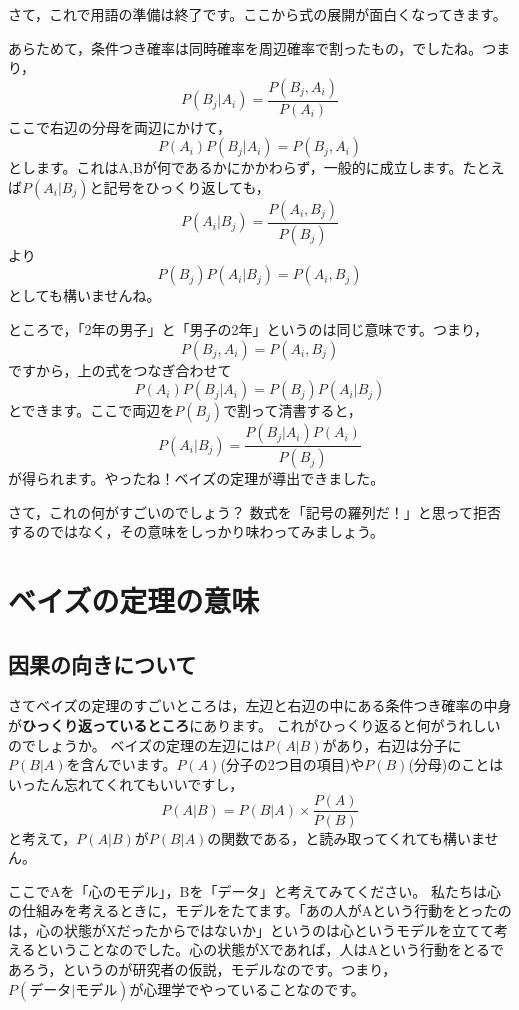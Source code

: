 \documentclass{ltjbook}
\begin{document}
さて，これで用語の準備は終了です。ここから式の展開が面白くなってきます。

あらためて，条件つき確率は同時確率を周辺確率で割ったもの，でしたね。つまり，
\[ P(B_j | A_i) = \frac{P(B_j,A_i)}{P(A_i)} \]
ここで右辺の分母を両辺にかけて，
\[ P(A_i)P(B_j|A_i) = P(B_j,A_i) \]
とします。これはA,Bが何であるかにかかわらず，一般的に成立します。たとえば$P(A_i|B_j)$と記号をひっくり返しても，
\[ P(A_i|B_j) = \frac{P(A_i,B_j)}{P(B_j)} \]
より
\[P(B_j)P(A_i|B_j) = P(A_i,B_j) \]
としても構いませんね。


ところで，「2年の男子」と「男子の2年」というのは同じ意味です。つまり，
\[P(B_j,A_i) = P(A_i, B_j) \]
ですから，上の式をつなぎ合わせて
\[P(A_i)P(B_j|A_i) = P(B_j)P(A_i|B_j) \]
とできます。ここで両辺を$P(B_j)$で割って清書すると，
\[ P(A_i | B_j )=\frac{P(B_j|A_i)P(A_i)}{P(B_j)} \]
が得られます。やったね！ベイズの定理が導出できました。


さて，これの何がすごいのでしょう？ 数式を「記号の羅列だ！」と思って拒否するのではなく，その意味をしっかり味わってみましょう。
\section{ベイズの定理の意味}
\subsection{因果の向きについて}
さてベイズの定理のすごいところは，左辺と右辺の中にある条件つき確率の中身が\textbf{ひっくり返っているところ}にあります。
これがひっくり返ると何がうれしいのでしょうか。
ベイズの定理の左辺には$P(A|B)$があり，右辺は分子に$P(B|A)$を含んでいます。$P(A)$(分子の2つ目の項目)や$P(B)$(分母)のことはいったん忘れてくれてもいいですし，
\[ P(A|B) = P(B|A) \times \frac{P(A)}{P(B)}\]
と考えて，$P(A|B)$が$P(B|A)$の関数である，と読み取ってくれても構いません。

ここでAを「心のモデル」，Bを「データ」と考えてみてください。
私たちは心の仕組みを考えるときに，モデルをたてます。「あの人がAという行動をとったのは，心の状態がXだったからではないか」というのは心というモデルを立てて考えるということなのでした。心の状態がXであれば，人はAという行動をとるであろう，というのが研究者の仮説，モデルなのです。つまり，$P(\mbox{データ}|\mbox{モデル})$が心理学でやっていることなのです。
\end{document}
